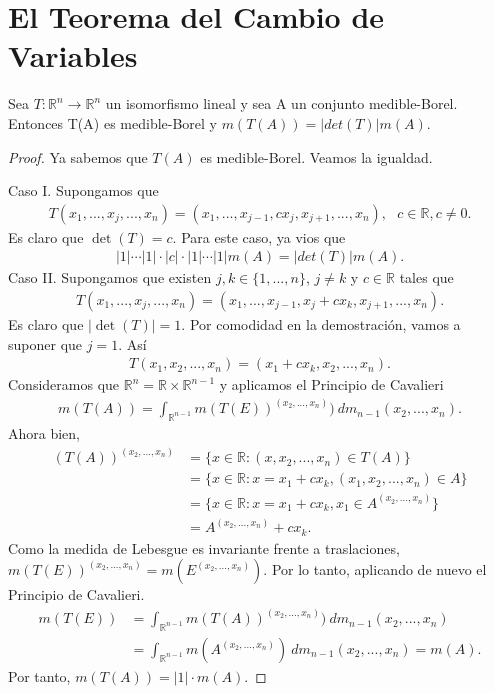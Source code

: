 \chapter{El Teorema del Cambio de Variables}

\begin{prop}
    Sea $T: \mathbb{R}^n \longrightarrow \mathbb{R}^n$ un isomorfismo lineal y sea A un conjunto medible-Borel. Entonces T(A) es medible-Borel y $m(T(A)) = |det(T)|m(A)$.
\end{prop}

\begin{proof}
    Ya sabemos que $T(A)$ es medible-Borel. Veamos la igualdad.

    Caso I. Supongamos que
    \begin{align*}
        T(x_1,...,x_j,...,x_n) = (x_1,...,x_{j-1},cx_j,x_{j+1},...,x_n), \ \ \ c \in \mathbb{R}, c \not = 0.
    \end{align*}
    Es claro que $\det(T) = c$. Para este caso, ya vios que
    \begin{align*}
        |1| \cdots |1|\cdot |c| \cdot |1| \cdots |1|m(A) = |det(T)|m(A).
    \end{align*}
    Caso II. Supongamos que existen $j, k \in \{1,...,n\}$, $j \not = k$ y $c \in \mathbb{R}$ tales que
    \begin{align*}
        T(x_1,...,x_j,...,x_n) = (x_1,...,x_{j-1},x_j +cx_k,x_{j+1},...,x_n).
    \end{align*}
    Es claro que $|\det(T)| = 1$. Por comodidad en la demostración, vamos a suponer que $j = 1$. Así
    \begin{align*}
        T(x_1,x_2,...,x_n) = (x_1 +cx_k,x_2,...,x_n).
    \end{align*}
    Consideramos que $\mathbb{R}^n = \mathbb{R} \times \mathbb{R}^{n-1}$ y aplicamos el Principio de Cavalieri
    \begin{align*}
        m(T(A)) = \int_{\mathbb{R}^{n-1}}{m(T(E))^{(x_2,...,x_n)}) \ dm_{n-1}(x_2,...,x_n)}.
    \end{align*}
    Ahora bien,
    \begin{align*}
        (T(A))^{(x_2,...,x_n)} & = \{ x \in \mathbb{R} : (x,x_2,...,x_n) \in T(A) \}                 \\
                               & = \{ x \in \mathbb{R} : x = x_1 + cx_k, (x_1,x_2,...,x_n) \in A \}  \\
                               & = \{x \in \mathbb{R} : x = x_1 + cx_k, x_1 \in A^{(x_2,...,x_n)} \} \\
                               & = A^{(x_2,...,x_n)} + cx_k.
    \end{align*}
    Como la medida de Lebesgue es invariante frente a traslaciones, $m(T(E))^{(x_2,...,x_n)} = m(E^{(x_2,...,x_n)})$. Por lo tanto, aplicando de nuevo el Principio de Cavalieri.
    \begin{align*}
        m(T(E)) & = \int_{\mathbb{R}^{n-1}}{m(T(A))^{(x_2,...,x_n)}) \ dm_{n-1}(x_2,...,x_n)}     \\
                & = \int_{\mathbb{R}^{n-1}}{m(A^{(x_2,...,x_n)}) \ dm_{n-1}(x_2,...,x_n)} = m(A).
    \end{align*}
    Por tanto, $m(T(A)) = |1|\cdot m(A)$.


\end{proof}
